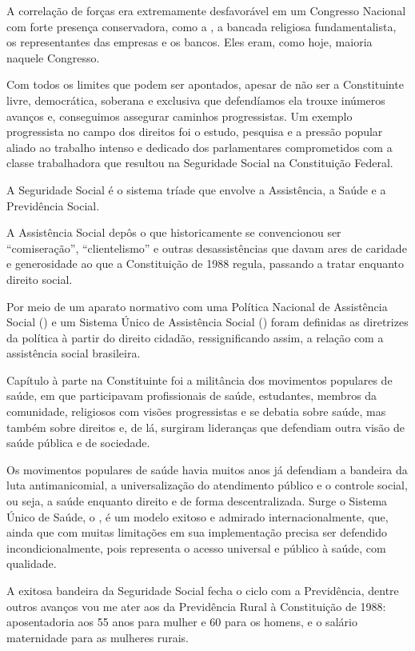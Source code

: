 A correlação de forças era extremamente desfavorável em um Congresso
Nacional com forte presença conservadora, como a , a bancada
religiosa fundamentalista, os representantes das empresas e os bancos.
Eles eram, como hoje, maioria naquele Congresso.

Com todos os limites que podem ser apontados, apesar de não ser a
Constituinte livre, democrática, soberana e exclusiva que defendíamos
ela trouxe inúmeros avanços e, conseguimos assegurar caminhos
progressistas. Um exemplo progressista no campo dos direitos foi o
estudo, pesquisa e a pressão popular aliado ao trabalho intenso e
dedicado dos parlamentares comprometidos com a classe trabalhadora que
resultou na Seguridade Social na Constituição Federal.

A Seguridade Social é o sistema tríade que envolve a Assistência, a
Saúde e a Previdência Social.

A Assistência Social depôs o que historicamente se convencionou ser
``comiseração'', ``clientelismo'' e outras desassistências que davam
ares de caridade e generosidade ao que a Constituição de 1988 regula,
passando a tratar enquanto direito social.

Por meio de um aparato normativo com uma Política Nacional de
Assistência Social () e um Sistema Único de Assistência Social
() foram definidas as diretrizes da política à partir do direito
cidadão, ressignificando assim, a relação com a assistência social
brasileira.

Capítulo à parte na Constituinte foi a militância dos movimentos
populares de saúde, em que participavam profissionais de saúde,
estudantes, membros da comunidade, religiosos com visões progressistas e
se debatia sobre saúde, mas também sobre direitos e, de lá, surgiram
lideranças que defendiam outra visão de saúde pública e de sociedade.

Os movimentos populares de saúde havia muitos anos já defendiam a
bandeira da luta antimanicomial, a universalização do atendimento
público e o controle social, ou seja, a saúde enquanto direito e de
forma descentralizada. Surge o Sistema Único de Saúde, o , é um
modelo exitoso e admirado internacionalmente, que, ainda que com muitas
limitações em sua implementação precisa ser defendido
incondicionalmente, pois representa o acesso universal e público à
saúde, com qualidade.

A exitosa bandeira da Seguridade Social fecha o ciclo com a Previdência,
dentre outros avanços vou me ater aos da Previdência Rural à
Constituição de 1988: aposentadoria aos 55 anos para mulher e 60 para os
homens, e o salário maternidade para as mulheres rurais.

